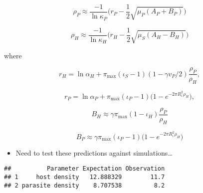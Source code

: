 \documentclass[
]{article}
\providecommand{\tightlist}{%
  \setlength{\itemsep}{0pt}\setlength{\parskip}{0pt}}
\begin{document}
\[\rho_P\approx \frac{-1}{\ln\kappa_P}\Big(r_P-\frac{1}{2}\sqrt{\mu_P(A_P+B_P)}\Big)\]

\[\rho_H\approx \frac{-1}{\ln\kappa_H}\Big(r_H-\frac{1}{2}\sqrt{\mu_S(A_H-B_H)}\Big)\]

where

\[r_H=\ln\alpha_H+\pi_{\max}(\iota_S-1)(1-\gamma v_P/2)\frac{\rho_P}{\rho_H},\]

\[r_P=\ln\alpha_P+\pi_{\max}(\iota_P-1)\big(1-e^{-2\pi R_\iota^2\rho_H}\big),\]

\[B_H\approx\gamma\pi_{\max}(1-\iota_H)\frac{\rho_P}{\rho_H}\]

\[B_P\approx\gamma\pi_{\max}(\iota_P-1)\big(1-e^{-2\pi R_\iota^2\rho_H}\big)\]

\begin{itemize}
\tightlist
\item
  Need to test these predictions against simulations\ldots{}
\end{itemize}

\begin{verbatim}
##          Parameter Expectation Observation
## 1     host density   12.888329        11.7
## 2 parasite density    8.707538         8.2
\end{verbatim}
\end{document}
